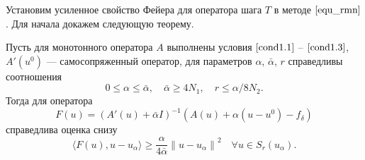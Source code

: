 Установим усиленное свойство Фейера для оператора шага $T$ в методе $\eqref{equ_rmn}$. Для начала докажем следующую теорему.
\begin{theorem}\label{teo2.2} Пусть для монотонного оператора $A$ выполнены условия $\eqref{cond1.1}$ -- $\eqref{cond1.3}$, $A'(u^0)$ --- самосопряженный оператор, для параметров $\alpha$, $\bar{\alpha}$, $r$ справедливы соотношения 
	\begin{equation}\label{cond2.7}
	0\le\alpha\le\bar\alpha,\quad\bar\alpha\ge 4N_1,\quad r\le\alpha/8N_2.
	\end{equation}
	Тогда для оператора
	$$ F(u)=(A'(u)+\bar\alpha I)^{-1}(A(u)+\alpha(u-u^0)-f_\delta) $$
	справедлива оценка снизу
	\begin{equation}\label{est2.8}
	\langle F(u), u-u_\alpha\rangle\ge\frac{\alpha}{4\bar\alpha}{\|u-u_\alpha\|}^2 \quad \forall u \in S_r(u_\alpha).
	\end{equation}
\end{theorem}
